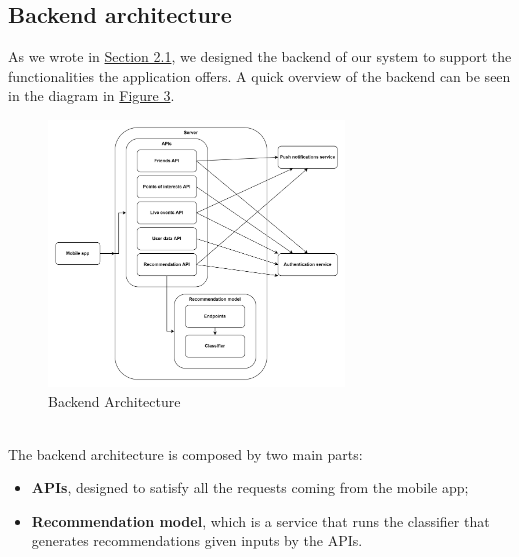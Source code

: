\documentclass[../../main]{subfiles}
\begin{document}
\subsection{Backend architecture}
\label{ss:backend-architecture}

As we wrote in \hyperref[ss:overall-system-architecture]{Section 2.1}, we designed the backend of our system to support the functionalities the application offers.
A quick overview of the backend can be seen in the diagram in \hyperref[fig:backend_architecture]{Figure 3}.
\begin{figure}[h]
    \centering
    \includegraphics[width=0.7\textwidth]{images/backend_architecture}
    \caption{Backend Architecture}\label{fig:backend_architecture}
\end{figure}\\
\noindent
The backend architecture is composed by two main parts:
\begin{itemize}
    \item \textbf{APIs}, designed to satisfy all the requests coming from the mobile app;
    \item \textbf{Recommendation model}, which is a service that runs the classifier that generates recommendations given inputs by the APIs.
\end{itemize}
\end{document}
